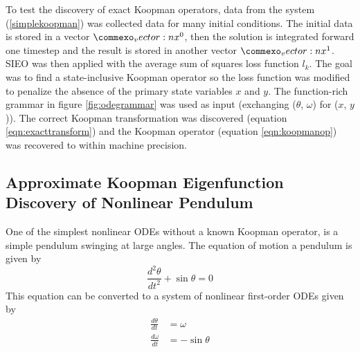 \documentclass{article}
\renewcommand{\vec}[1]{\vect{#1}}
\begin{document}
To test the discovery of exact Koopman operators, data from the system (\ref{simplekoopman}) was collected data for many initial conditions. The initial data is stored in a vector $\vec{x}^0$, then the solution is integrated forward one timestep and the result is stored in another vector $\vec{x}^1$. SIEO was then applied with the average sum of squares loss function $l_k$. The goal was to find a state-inclusive Koopman operator so the loss function was modified to penalize the absence of the primary state variables $x$ and $y$. The function-rich grammar in figure \ref{fig:odegrammar} was used as input (exchanging ($\theta$, $\omega$) for ($x$, $y$)). The correct Koopman transformation was discovered (equation \ref{eqn:exacttransform}) and the Koopman operator (equation \ref{eqn:koopmanop}) was recovered to within machine precision.







\subsection{Approximate Koopman Eigenfunction Discovery of Nonlinear Pendulum}
One of the simplest nonlinear ODEs without a known Koopman operator, is a simple pendulum swinging at large angles. The equation of motion a pendulum is given by
\[ \frac{d^2 \theta}{d t^2} + \sin \theta = 0 \]
This equation can be converted to a system of nonlinear first-order ODEs given by
\begin{align*}
\frac{d\theta}{dt} &= \omega \\
\frac{d\omega}{dt} &= -\sin \theta
\end{align*}
\end{document}
